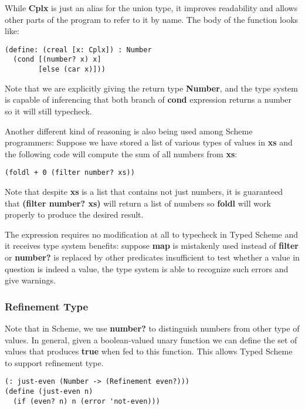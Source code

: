 While \textbf{Cplx} is just an alias for the union type, it improves readability
and allows other parts of the program to refer to it by name.
The body of the function looks like:

\begin{verbatim}
(define: (creal [x: Cplx]) : Number
  (cond [(number? x) x]
        [else (car x)]))
\end{verbatim}

Note that we are explicitly giving the return type \textbf{Number},
and the type system is capable of inferencing that
both branch of \textbf{cond} expression returns a number
so it will still typecheck.

Another different kind of reasoning is also being used among Scheme programmers:
Suppose we have stored a list of various types of values in \textbf{xs}
and the following code will compute the sum of all numbers from \textbf{xs}:

\begin{verbatim}
(foldl + 0 (filter number? xs))
\end{verbatim}

Note that despite \textbf{xs} is a list that contains not just numbers,
it is guaranteed that \textbf{(filter number? xs)} will return a list of numbers
so \textbf{foldl} will work properly to produce the desired result.

The expression requires no modification at all to typecheck in Typed Scheme
and it receives type system benefits: suppose \textbf{map} is mistakenly
used instead of \textbf{filter} or \textbf{number?} is replaced by
other predicates insufficient to test whether a value in question is indeed a value,
the type system is able to recognize such errors and give warnings.

\subsubsection{Refinement Type}

Note that in Scheme, we use \textbf{number?} to distinguish numbers
from other type of values.
In general, given a boolean-valued unary function
we can define the set of values that produces \textbf{true} when fed to this function.
This allows Typed Scheme to support refinement type.

\begin{verbatim}
(: just-even (Number -> (Refinement even?)))
(define (just-even n)
  (if (even? n) n (error 'not-even)))
\end{verbatim}

